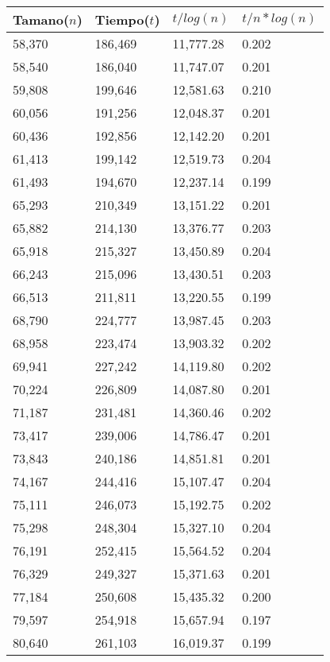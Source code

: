 \begin{table}[H]
\parbox{0.3\textwidth}{
  \begin{tabular}{| l | l | l |l |}
    \hline
    Tamano($n$) & Tiempo($t$) & $t / log(n)$ & $t / n*log(n)$ \\ \hline
58,370	&	186,469	&	11,777.28	&	0.202	\\ \hline
58,540	&	186,040	&	11,747.07	&	0.201	\\ \hline
59,808	&	199,646	&	12,581.63	&	0.210	\\ \hline
60,056	&	191,256	&	12,048.37	&	0.201	\\ \hline
60,436	&	192,856	&	12,142.20	&	0.201	\\ \hline
61,413	&	199,142	&	12,519.73	&	0.204	\\ \hline
61,493	&	194,670	&	12,237.14	&	0.199	\\ \hline
65,293	&	210,349	&	13,151.22	&	0.201	\\ \hline
65,882	&	214,130	&	13,376.77	&	0.203	\\ \hline
65,918	&	215,327	&	13,450.89	&	0.204	\\ \hline
66,243	&	215,096	&	13,430.51	&	0.203	\\ \hline
66,513	&	211,811	&	13,220.55	&	0.199	\\ \hline
68,790	&	224,777	&	13,987.45	&	0.203	\\ \hline
68,958	&	223,474	&	13,903.32	&	0.202	\\ \hline
69,941	&	227,242	&	14,119.80	&	0.202	\\ \hline
70,224	&	226,809	&	14,087.80	&	0.201	\\ \hline
71,187	&	231,481	&	14,360.46	&	0.202	\\ \hline
73,417	&	239,006	&	14,786.47	&	0.201	\\ \hline
73,843	&	240,186	&	14,851.81	&	0.201	\\ \hline
74,167	&	244,416	&	15,107.47	&	0.204	\\ \hline
75,111	&	246,073	&	15,192.75	&	0.202	\\ \hline
75,298	&	248,304	&	15,327.10	&	0.204	\\ \hline
76,191	&	252,415	&	15,564.52	&	0.204	\\ \hline
76,329	&	249,327	&	15,371.63	&	0.201	\\ \hline
77,184	&	250,608	&	15,435.32	&	0.200	\\ \hline
79,597	&	254,918	&	15,657.94	&	0.197	\\ \hline
80,640	&	261,103	&	16,019.37	&	0.199	\\ \hline

\end{tabular}}
\end{table}
